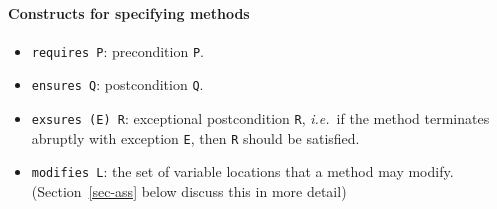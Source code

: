 \documentclass[a4paper]{llncs}
\newcommand{\escj}{\textsc{Esc/Java}}
\begin{document}
\paragraph{\bf Constructs for specifying methods} 
\begin{itemize}
\item{\texttt{requires P}: precondition {\tt P}.}
 
\item{\texttt{ensures Q}: postcondition {\tt Q}.} 
 
\item{\texttt{exsures (E) R}: exceptional postcondition \texttt{R},
\emph{i.e.}~if the method terminates abruptly with exception
\texttt{E}, then \texttt{R} should be satisfied.}

\item{\texttt{modifies L}: the set of variable locations that
a method may modify. (Section~\ref{sec-ass} below discuss this in more 
detail)}
 
\end{itemize}
 
 
 
\end{document}
